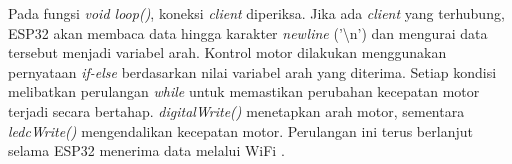 Pada fungsi \emph{void loop()}, koneksi \emph{client} diperiksa. Jika ada \emph{client} yang terhubung, ESP32 akan membaca data hingga karakter \emph{newline} ('\textbackslash n') dan mengurai data tersebut menjadi variabel arah. Kontrol motor dilakukan menggunakan pernyataan \emph{if-else} berdasarkan nilai variabel arah yang diterima. Setiap kondisi melibatkan perulangan \emph{while} untuk memastikan perubahan kecepatan motor terjadi secara bertahap. \emph{digitalWrite()} menetapkan arah motor, sementara \emph{ledcWrite()} mengendalikan kecepatan motor. Perulangan ini terus berlanjut selama ESP32 menerima data melalui WiFi \parencite{ekatama2024perancangan}.